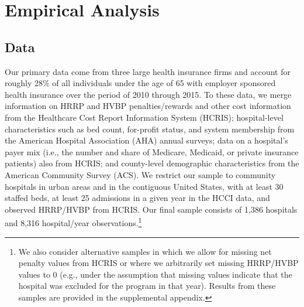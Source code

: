 \documentclass[12pt]{article}
\begin{document}
\section{Empirical Analysis}
\label{sec:Empirical}

\subsection{Data}
Our primary data come from three large health insurance firms and account for roughly 28$\%$ of all individuals under the age of 65 with employer sponsored health insurance over the period of 2010 through 2015.  To these data, we merge information on HRRP and HVBP penalties/rewards and other cost information from the Healthcare Cost Report Information System (HCRIS); hospital-level characteristics such as bed count, for-profit status, and system membership from the American Hospital Association (AHA) annual surveys; data on a hospital's payer mix (i.e., the number and share of Medicare, Medicaid, or private insurance patients) also from HCRIS; and county-level demographic characteristics from the American Community Survey (ACS).  We restrict our sample to community hospitals in urban areas and in the contiguous United States, with at least 30 staffed beds, at least 25 admissions in a given year in the HCCI data, and observed HRRP/HVBP from HCRIS. Our final sample consists of 1,386 hospitals and 8,316 hospital/year observations.\footnote{We also consider alternative samples in which we allow for missing net penalty values from HCRIS or where we arbitrarily set missing HRRP/HVBP values to 0 (e.g., under the assumption that missing values indicate that the hospital was excluded for the program in that year). Results from these samples are provided in the supplemental appendix.}
\end{document}
